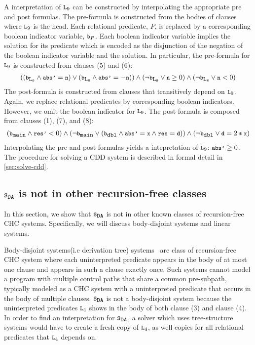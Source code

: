 %
A interpretation of $\cc{L}_9$ can be constructed by interpolating
the appropriate pre and post formulas.
%
The pre-formula is constructed from the bodies of clauses where
$\cc{L}_9$ is the head. 
%
Each relational predicate, $P$,
is replaced by a corresponding boolean indicator variable, $\cc{b}_P$.
%
Each
boolean indicator variable implies the solution for its predicate which is encoded
as the disjunction of the negation of the boolean indicator variable and the solution.
%
In particular, the pre-formula for $\cc{L}_9$ is constructed from
clauses (5) and (6):
\begin{gather}
  ((\cc{b}_{\cc{L}_6} \land \cc{abs'} = \cc{n})
  \lor
  (\cc{b}_{\cc{L}_8} \land \cc{abs'} = -\cc{n}))
  \land
  (\neg \cc{b}_{\cc{L}_6} \lor \cc{n} \ge 0)
  \land
  (\neg \cc{b}_{\cc{L}_8} \lor \cc{n} < 0)
\end{gather}
%
The post-formula is constructed from clauses that transitively depend
on $\cc{L}_9$. Again, we replace relational predicates by
corresponding boolean indicators. However, we omit the boolean indicator for
$\cc{L}_9$. The post-formula is composed from clauses (1), (7), and
(8):
\begin{gather}
  (\cc{b}_{\cc{main}} \land \cc{res'} < 0)
  \land
  (\neg \cc{b}_{\cc{main}} \lor
    (\cc{b}_{\cc{dbl}}
    \land \cc{abs'}= \cc{x}
    \land \cc{res}=\cc{d} ))
  \land (\neg \cc{b}_{\cc{dbl}} \lor \cc{d} = 2*\cc{x})
\end{gather}
%
Interpolating the pre and post formulas yields a intepretation
of $\cc{L}_9$: $\cc{abs'} \geq 0$.
%
The procedure for solving a CDD system is described in formal detail
in \autoref{sec:solve-cdd}.

\subsection{$\mcchc$ is not in other recursion-free classes}
\label{sec:not-in}
%
In this section, we show that $\mcchc$ is not in other
known classes of recursion-free CHC systems. 
%
Specifically, we will
discuss body-disjoint systems and linear systems.
%

Body-disjoint systems(i.e derivation tree)
systems~\cite{mcmillan14,bjorner13,heizmann10,rummer13a,rummer13b} are
class of recursion-free CHC system where each uninterpreted predicate
appears in the body of at most one clause and appears in such a
clause exactly once.
%
Such systems cannot model a program with multiple control paths that
share a common pre-subpath, typically modeled as a CHC system with a
uninterpreted predicate that occurs in the body of multiple clauses.
%
$\mcchc$ is not a body-disjoint system because the uninterpreted
predicates $\cc{L}_4$ shows in the body of both clause (3) and clause
(4).
%
In order to find an interpretation for $\mcchc$, a solver which uses
tree-structure systems would have to create a fresh copy of
$\cc{L}_4$, as well copies for all relational predicates that
$\cc{L}_4$ depends on.


